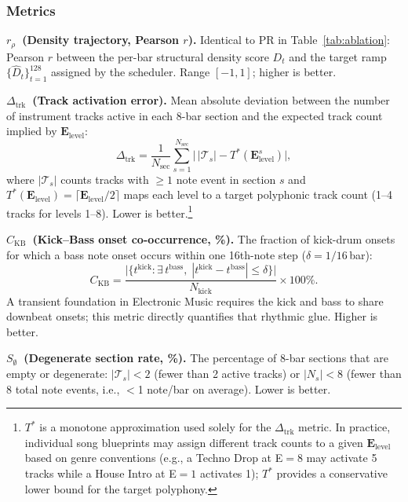 \documentclass[pdflatex,sn-mathphys-num,twocolumn]{sn-jnl}
\theoremstyle{thmstyleone}
\theoremstyle{thmstyletwo}
\begin{document}
\subsubsection*{Metrics}

\noindent\textbf{$r_\rho$~(Density trajectory, Pearson $r$).}
Identical to PR in Table~\ref{tab:ablation}: Pearson $r$ between the
per-bar structural density score $D_t$ and the target ramp
$\{\hat{D}_t\}_{t=1}^{128}$ assigned by the scheduler.
Range $[-1,1]$; higher is better.

\noindent\textbf{$\Delta_\mathrm{trk}$~(Track activation error).}
Mean absolute deviation between the number of instrument tracks active in
each 8-bar section and the expected track count implied by $\mathbf{E}_\mathrm{level}$:
\begin{equation}\label{eq:delta_trk}
  \Delta_\mathrm{trk}
  = \frac{1}{N_\mathrm{sec}}
    \sum_{s=1}^{N_\mathrm{sec}}
    \bigl|\,|\mathcal{T}_s| - T^*(\mathbf{E}^s_\mathrm{level})\bigr|,
\end{equation}
where $|\mathcal{T}_s|$ counts tracks with $\geq 1$ note event in section $s$
and $T^*(\mathbf{E}_\mathrm{level}) = \bigl\lceil \mathbf{E}_\mathrm{level}/2\bigr\rceil$
maps each level to a target polyphonic track count (1–4 tracks for levels 1–8).
Lower is better.\footnote{$T^*$ is a monotone approximation used solely for the
$\Delta_\mathrm{trk}$ metric.  In practice, individual song blueprints may
assign different track counts to a given $\mathbf{E}_\mathrm{level}$ based on
genre conventions (e.g., a Techno Drop at E$=8$ may activate 5 tracks while a
House Intro at E$=1$ activates 1); $T^*$ provides a conservative lower bound
for the target polyphony.}

\noindent\textbf{$C_\mathrm{KB}$~(Kick–Bass onset co-occurrence, \%).}
The fraction of kick-drum onsets for which a bass note onset occurs within
one 16th-note step ($\delta = 1/16$\,bar):
\begin{equation}\label{eq:ckb}
  C_\mathrm{KB}
  = \frac{\bigl|\bigl\{t^\mathrm{kick}
    : \exists\,t^\mathrm{bass},\;
      |t^\mathrm{kick} - t^\mathrm{bass}| \leq \delta\bigr\}\bigr|}
         {N_\mathrm{kick}}
  \times 100\%.
\end{equation}
A transient foundation in Electronic Music requires the kick and bass to
share downbeat onsets; this metric directly quantifies that rhythmic glue.
Higher is better.

\noindent\textbf{$S_\emptyset$~(Degenerate section rate, \%).}
The percentage of 8-bar sections that are empty or degenerate:
$|\mathcal{T}_s| < 2$ (fewer than 2 active tracks) or
$|N_s| < 8$ (fewer than 8 total note events, i.e., $<$1 note/bar on average).
Lower is better.
\end{document}
